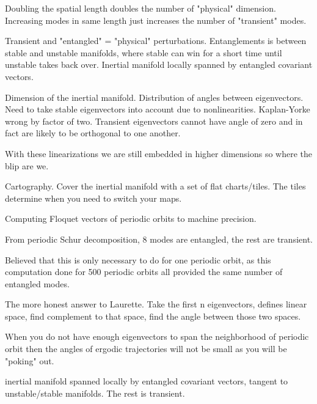 \begin{description}
{\begin{description}
Doubling the spatial length doubles the number of "physical" dimension. Increasing
modes in same length just increases the number of "transient" modes.

Transient and "entangled" = "physical" perturbations. Entanglements is between stable and unstable
manifolds, where stable can win for a short time until unstable takes back over. Inertial manifold
locally spanned by entangled covariant vectors.

Dimension of the inertial manifold.
Distribution of angles between eigenvectors. Need to take stable eigenvectors into
account due to nonlinearities. Kaplan-Yorke wrong by factor of two.
Transient eigenvectors cannot have angle of zero and in fact are likely to be orthogonal
to one another.

With these linearizations we are still embedded in higher dimensions so where the blip are we.

Cartography. Cover the inertial manifold with a set of flat charts/tiles. The tiles determine
when you need to switch your maps.

Computing Floquet vectors of periodic orbits to machine
precision.

From periodic Schur decomposition, 8 modes are entangled, the rest are transient.

Believed that this is only necessary to do for one periodic orbit, as this
computation done for 500 periodic orbits all provided the same number of entangled
modes.

The more honest answer to Laurette. Take the first n eigenvectors, defines linear space,
find complement to that space, find the angle between those two spaces.

When you do not have enough eigenvectors to span the neighborhood of periodic orbit
then the angles of ergodic trajectories will not be small as you will be "poking" out.

inertial manifold spanned locally by entangled covariant vectors, tangent to unstable/stable
manifolds. The rest is transient.
\end{description}
}

\end{description}
